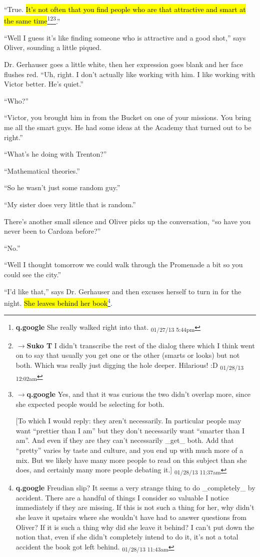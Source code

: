 ``True.  \hl{It's not often that you find people who are that attractive and smart at the same time}\footnote{\textbf{q.google }She really walked right into that. \textsubscript{01/27/13 5:44pm}}\footnote{$\rightarrow$\textbf{Suko T }I didn't transcribe the rest of the dialog there which I think went on to say that usually you get one or the other (smarts or looks) but not both.  Which was really just digging the hole deeper.  Hilarious! :D \textsubscript{01/28/13 12:02am}}\footnote{$\rightarrow$\textbf{q.google }Yes, and that it was curious the two didn't overlap more, since she expected people would be selecting for both.

{[}To which I would reply: they aren't necessarily.  In particular people may want ``prettier than I am'' but they don't necessarily want ``smarter than I am''.  And even if they are they can't necessarily \_get\_ both.  Add that ``pretty'' varies by taste and culture, and you end up with much more of a mix.  But we likely have many more people to read on this subject than she does, and certainly many more people debating it.{]} \textsubscript{01/28/13 11:37am}}.''

``Well I guess it's like finding someone who is attractive and a good shot,'' says Oliver, sounding a little piqued.

Dr. Gerhauser goes a little white, then her expression goes blank and her face flushes red.  ``Uh, right.  I don't actually like working with him.  I like working with Victor better.  He's quiet.''

``Who?''

``Victor, you brought him in from the Bucket on one of your missions.  You bring me all the smart guys.  He had some ideas at the Academy that turned out to be right.''

``What's he doing with Trenton?''

``Mathematical theories.''

``So he wasn't just some random guy.''

``My sister does very little that is random.''

There's another small silence and Oliver picks up the conversation, ``so have you never been to Cardoza before?''

``No.''

``Well I thought tomorrow we could walk through the Promenade a bit so you could see the city.''

``I'd like that,'' says Dr. Gerhauser and then excuses herself to turn in for the night.  \hl{She leaves behind her book}\footnote{\textbf{q.google }Freudian slip?  It seems a very strange thing to do \_completely\_ by accident.  There are a handful of things I consider so valuable I notice immediately if they are missing.  If this is not such a thing for her, why didn't she leave it upstairs where she wouldn't have had to answer questions from Oliver?  If it is such a thing why did she leave it behind?  I can't put down the notion that, even if she didn't completely intend to do it, it's not a total accident the book got left behind. \textsubscript{01/28/13 11:43am}}.




